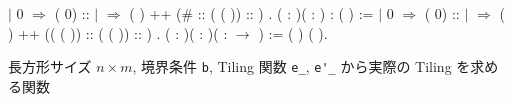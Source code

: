 \documentclass[12pt]{report}
\begin{document}
\begin{coqdoccode}
\coqdocindent{0.50em}
  \coqdoceol
\coqdocindent{1.50em}
\ensuremath{|} 0 \ensuremath{\Rightarrow} (  0) :: \coqdoceol
\coqdocindent{1.50em}
\ensuremath{|}   \ensuremath{\Rightarrow} (   ) ++ (\# :: (  ( )) :: )\coqdoceol
\coqdocindent{0.50em}
.\coqdoceol
\coqdocnoindent
{}  (  : )(  : ) :  ( ) :=\coqdoceol
\coqdocindent{0.50em}
  \coqdoceol
\coqdocindent{1.50em}
\ensuremath{|} 0 \ensuremath{\Rightarrow} (   0) :: \coqdoceol
\coqdocindent{1.50em}
\ensuremath{|}   \ensuremath{\Rightarrow} (    ) ++ ((   ( )) :: (   ( )) :: )\coqdoceol
\coqdocindent{0.50em}
.\coqdoceol
\coqdocnoindent
{}  (  : )( : )(  :  \ensuremath{\rightarrow} ) :=    ( ) ( ).\coqdoceol
\end{coqdoccode}
 長方形サイズ $n \times m$, 境界条件 \verb|b|, Tiling 関数 \verb|e_|, \verb|e'_| から実際の Tiling を求める関数  
\end{document}
